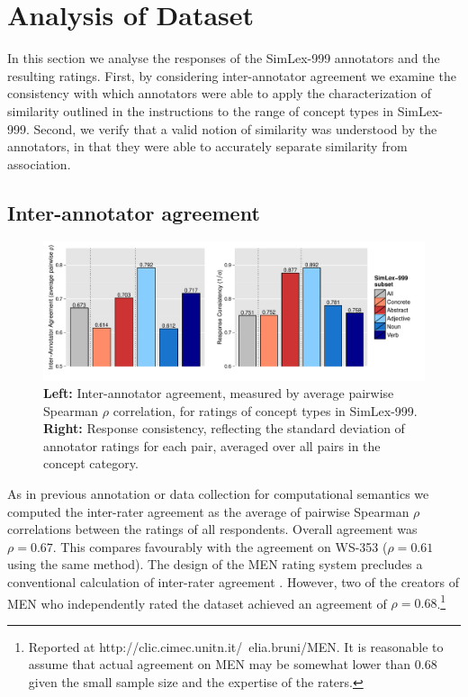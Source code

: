 \section{Analysis of Dataset}

In this section we analyse the responses of the SimLex-999 annotators and the resulting ratings. First, by considering inter-annotator agreement we examine the consistency with which annotators were able to apply the characterization of similarity outlined in the instructions to the range of concept types in SimLex-999. Second, we verify that a valid notion of similarity was understood by the annotators, in that they were able to accurately separate similarity from association. 

\subsection{Inter-annotator agreement}

\begin{figure}[ht]  \includegraphics[width = \textwidth]{Chapter_3/Figure_1A_CL}  \caption{{\bf Left:} Inter-annotator agreement, measured by average pairwise Spearman \(\rho\) correlation, for ratings of concept types in SimLex-999. {\bf Right:} Response consistency, reflecting the standard deviation of annotator ratings for each pair, averaged over all pairs in the concept category.}\end{figure}  

As in previous annotation or data collection for computational semantics \cite{pado2007flexible,reisinger2010mixture,silberer2014learning} we computed the inter-rater agreement as the average of pairwise Spearman \(\rho\) correlations between the ratings of all respondents. Overall agreement was \(\rho=0.67\). This compares favourably with the agreement on WS-353 (\(\rho=0.61\) using the same method). The design of the MEN rating system precludes a conventional calculation of inter-rater agreement \cite{bruni2012distributional2}. However, two of the creators of MEN who independently rated the dataset achieved an agreement of \(\rho=0.68\).\footnote{Reported at http://clic.cimec.unitn.it/~elia.bruni/MEN. It is reasonable to assume that actual agreement on MEN may be somewhat lower than 0.68 given the small sample size and the expertise of the raters.} 


